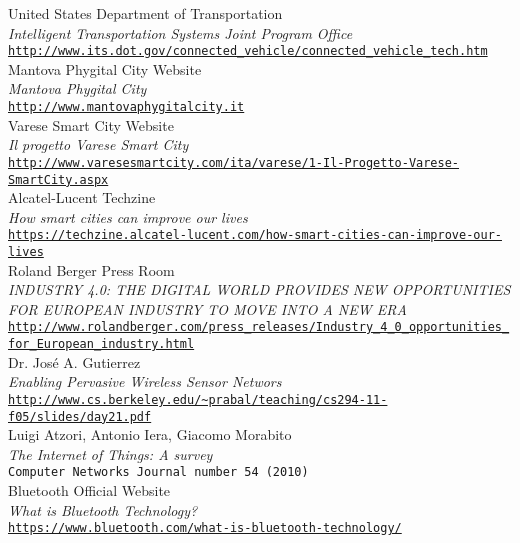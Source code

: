 \begin{thebibliography}{}
 United States Department of Transportation\\
  \emph{Intelligent Transportation Systems Joint Program Office} \\
  \footnotesize \texttt{\url{http://www.its.dot.gov/connected_vehicle/connected_vehicle_tech.htm}} \\
  
 Mantova Phygital City Website\\
  \emph{Mantova Phygital City} \\
  \footnotesize \texttt{\url{http://www.mantovaphygitalcity.it}} \\
  
 Varese Smart City Website\\
  \emph{Il progetto Varese Smart City} \\
  \footnotesize \texttt{\url{http://www.varesesmartcity.com/ita/varese/1-Il-Progetto-Varese-SmartCity.aspx}} \\
  
 Alcatel-Lucent Techzine\\
  \emph{How smart cities can improve our lives} \\
  \footnotesize \texttt{\url{https://techzine.alcatel-lucent.com/how-smart-cities-can-improve-our-lives}} \\
  
 Roland Berger Press Room\\
  \emph{INDUSTRY 4.0: THE DIGITAL WORLD PROVIDES NEW OPPORTUNITIES FOR EUROPEAN INDUSTRY TO MOVE INTO A NEW ERA
} \\
  \footnotesize \texttt{\url{http://www.rolandberger.com/press_releases/Industry_4_0_opportunities_for_European_industry.html}} \\
  
 Dr. José A. Gutierrez\\
  \emph{Enabling Pervasive Wireless Sensor Networs} \\
  \footnotesize \texttt{\url{http://www.cs.berkeley.edu/~prabal/teaching/cs294-11-f05/slides/day21.pdf}} \\
  
 Luigi Atzori, Antonio Iera, Giacomo Morabito\\
  \emph{The Internet of Things: A survey} \\
  \footnotesize \texttt{Computer Networks Journal number 54 (2010)} \\
  
 Bluetooth Official Website\\
  \emph{What is Bluetooth Technology?} \\
  \footnotesize \texttt{\url{https://www.bluetooth.com/what-is-bluetooth-technology/}} \\
  
\end{thebibliography}
